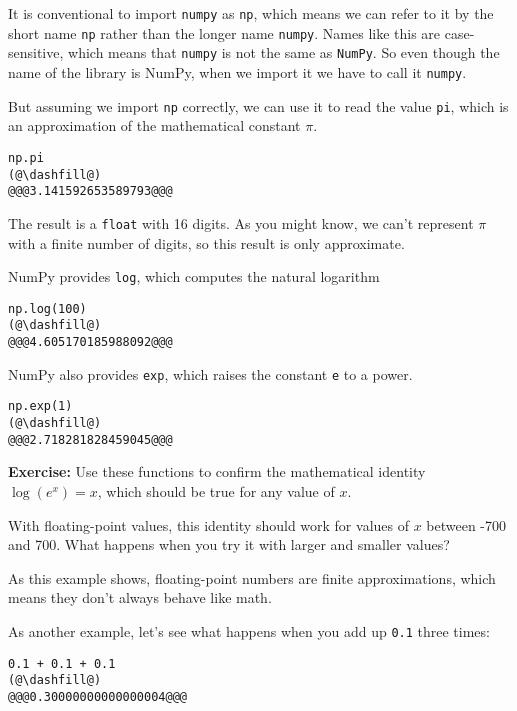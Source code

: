 It is conventional to import \passthrough{\lstinline!numpy!} as
\passthrough{\lstinline!np!}, which means we can refer to it by the
short name \passthrough{\lstinline!np!} rather than the longer name
\passthrough{\lstinline!numpy!}. Names like this are case-sensitive,
which means that \passthrough{\lstinline!numpy!} is not the same as
\passthrough{\lstinline!NumPy!}. So even though the name of the library
is NumPy, when we import it we have to call it
\passthrough{\lstinline!numpy!}.

But assuming we import \passthrough{\lstinline!np!} correctly, we can
use it to read the value \passthrough{\lstinline!pi!}, which is an
approximation of the mathematical constant \(\pi\).

\begin{lstlisting}[]
np.pi
(@\dashfill@)
@@@3.141592653589793@@@
\end{lstlisting}

The result is a \passthrough{\lstinline!float!} with 16 digits. As you
might know, we can't represent \(\pi\) with a finite number of digits,
so this result is only approximate.

NumPy provides \passthrough{\lstinline!log!}, which computes the natural
logarithm

\begin{lstlisting}[]
np.log(100)
(@\dashfill@)
@@@4.605170185988092@@@
\end{lstlisting}

NumPy also provides \passthrough{\lstinline!exp!}, which raises the
constant \passthrough{\lstinline!e!} to a power.

\begin{lstlisting}[]
np.exp(1)
(@\dashfill@)
@@@2.718281828459045@@@
\end{lstlisting}

\textbf{Exercise:} Use these functions to confirm the mathematical
identity \(\log(e^x) = x\), which should be true for any value of \(x\).

With floating-point values, this identity should work for values of
\(x\) between -700 and 700. What happens when you try it with larger and
smaller values?

As this example shows, floating-point numbers are finite approximations,
which means they don't always behave like math.

As another example, let's see what happens when you add up
\passthrough{\lstinline!0.1!} three times:

\begin{lstlisting}[]
0.1 + 0.1 + 0.1
(@\dashfill@)
@@@0.30000000000000004@@@
\end{lstlisting}

